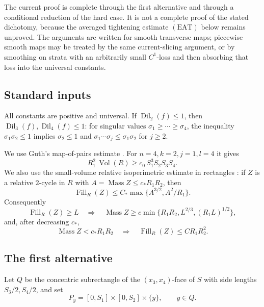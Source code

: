 \documentclass[12pt]{article}
\newcommand{\Dil}{\operatorname{Dil}}
\newcommand{\Vol}{\operatorname{Vol}}
\newcommand{\Mass}{\operatorname{Mass}}
\newcommand{\Fill}{\operatorname{Fill}}
\begin{document}
The current proof is complete through the first alternative and through a
conditional reduction of the hard case.  It is not a complete proof of the
stated dichotomy, because the averaged tightening estimate \((\mathrm{EAT})\)
below remains unproved.  The arguments are written for smooth transverse maps;
piecewise smooth maps may be treated by the same current-slicing argument, or
by smoothing on strata with an arbitrarily small \(C^1\)-loss and then
absorbing that loss into the universal constants.

\subsection*{Standard inputs}

All constants are positive and universal.  If \(\Dil_2(f)\le1\), then
\(\Dil_3(f),\Dil_4(f)\le1\): for singular values
\(\sigma_1\ge\cdots\ge\sigma_4\), the inequality
\(\sigma_1\sigma_2\le1\) implies \(\sigma_2\le1\) and
\(\sigma_1\cdots\sigma_j\le\sigma_1\sigma_2\) for \(j\ge2\).

We use Guth's map-of-pairs estimate \cite[Estimate 1]{GuthExpanding}.  For
\(n=4,k=2,j=1,l=4\) it gives
\begin{equation}\label{guth14}
        R_1^2\,\Vol(R)\ge c_0\,S_1^3S_2S_3S_4 .
\end{equation}
We also use the small-volume relative isoperimetric estimate in rectangles
\cite[Theorem 3]{GuthExpanding}: if \(Z\) is a relative \(2\)-cycle in \(R\)
with \(A=\Mass Z\le c_*R_1R_2\), then
\[
        \Fill_R(Z)\le C_*\max\{A^{3/2},A^2/R_1\}.
\]
Consequently
\begin{equation}\label{profile-inverse}
\Fill_R(Z)\ge L\quad\Longrightarrow\quad
\Mass Z\ge c\min\{R_1R_2,L^{2/3},(R_1L)^{1/2}\},
\end{equation}
and, after decreasing \(c_*\),
\begin{equation}\label{iso}
        \Mass Z<c_*R_1R_2\quad\Longrightarrow\quad
        \Fill_R(Z)\le C R_1R_2^2 .
\end{equation}

\subsection*{The first alternative}

Let \(Q\) be the concentric subrectangle of the \((x_3,x_4)\)-face of \(S\)
with side lengths \(S_3/2,S_4/2\), and set
\[
        P_y=[0,S_1]\times[0,S_2]\times\{y\},\qquad y\in Q.
\]
\end{document}
